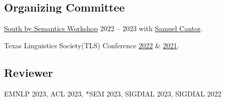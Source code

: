 \subsection{Organizing Committee}

\quad\href{https://sites.google.com/utexas.edu/sxsw}{South by Semantics Workshop} 2022 -- 2023 with \href{https://www.cantwolf.com}{Samuel Cantor}.

\quad Texas Linguistics Society(TLS) Conference \href{http://tls.ling.utexas.edu/2022/}{2022} \& \href{http://tls.ling.utexas.edu/2021/}{2021}.

\subsection{Reviewer}

\quad EMNLP 2023, ACL 2023, *SEM 2023, SIGDIAL 2023, SIGDIAL 2022
